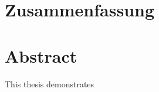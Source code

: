 \newpage
{}
{}
\chapter*{Zusammenfassung}
\thispagestyle{empty}

\newpage
{}
{}
\chapter*{Abstract}
\thispagestyle{empty}
This thesis demonstrates



